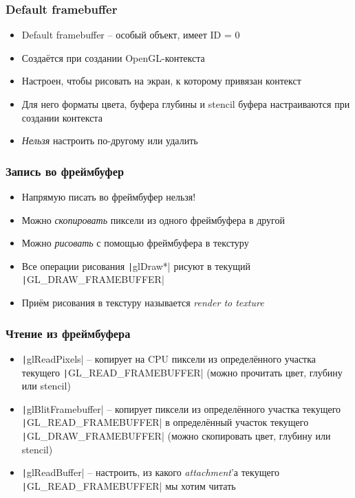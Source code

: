 \documentclass[10pt]{beamer}
\begin{document}
\begin{frame}[fragile]
\frametitle{Default framebuffer}
\begin{itemize}
\item Default framebuffer -- особый объект, имеет ID = 0
\pause
\item Создаётся при создании OpenGL-контекста
\pause
\item Настроен, чтобы рисовать на экран, к которому привязан контекст
\pause
\item Для него форматы цвета, буфера глубины и stencil буфера настраиваются при создании контекста
\pause
\item \textit{Нельзя} настроить по-другому или удалить
\end{itemize}
\end{frame}

\begin{frame}[fragile]
\frametitle{Запись во фреймбуфер}
\begin{itemize}
\item Напрямую писать во фреймбуфер нельзя!
\pause
\item Можно \textit{скопировать} пиксели из одного фреймбуфера в другой
\pause
\item Можно \textit{рисовать} с помощью фреймбуфера в текстуру
\pause
\item Все операции рисования \texttt|glDraw*| рисуют в текущий \texttt|GL_DRAW_FRAMEBUFFER|
\pause
\item Приём рисования в текстуру называется \textit{render to texture}
\end{itemize}
\end{frame}

\begin{frame}[fragile]
\frametitle{Чтение из фреймбуфера}
\begin{itemize}
\item \texttt|glReadPixels| -- копирует на CPU пиксели из определённого участка текущего \texttt|GL_READ_FRAMEBUFFER| (можно прочитать цвет, глубину или stencil)
\pause
\item \texttt|glBlitFramebuffer| -- копирует пиксели из определённого участка текущего \texttt|GL_READ_FRAMEBUFFER| в определённый участок текущего \texttt|GL_DRAW_FRAMEBUFFER| (можно скопировать цвет, глубину или stencil)
\pause
\item \texttt|glReadBuffer| -- настроить, из какого \textit{attachment}'а текущего \texttt|GL_READ_FRAMEBUFFER| мы хотим читать
\end{itemize}
\end{frame}
\end{document}
